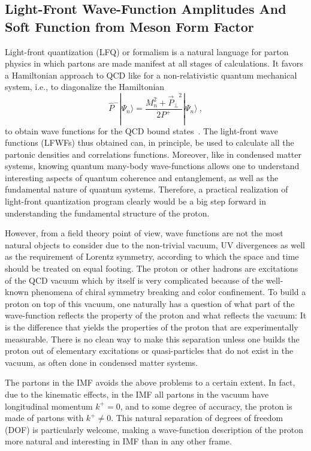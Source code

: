 \subsection{Light-Front Wave-Function Amplitudes And Soft Function from Meson Form Factor}
\label{sec:others}

Light-front quantization (LFQ) or formalism is a natural language for parton physics
in which partons are made manifest at all stages of calculations. It
favors a Hamiltonian approach to QCD like for a non-relativistic quantum
mechanical system, i.e., to diagonalize the Hamiltonian
\begin{equation}
	\hat P^-|\Psi_n\rangle = \frac{M^2_n+{\vec P_\perp}^2}{2P^+}|\Psi_n\rangle \ ,
\end{equation}
to obtain wave functions for the QCD bound states~\cite{Brodsky:1997de}.
The light-front wave functions (LFWFs) thus obtained can, in principle, be used to calculate
all the partonic densities and correlations functions. Moreover, like in
condensed matter systems, knowing quantum many-body wave-functions
allows one to understand interesting aspects of quantum coherence and
entanglement, as well as the fundamental nature of quantum systems.
Therefore, a practical realization of light-front quantization program clearly would be a big step
forward in understanding the fundamental structure of the proton.


However, from a field theory point of view, wave functions are not the most natural
objects to consider due to the non-trivial vacuum, UV divergences as well as the requirement of Lorentz symmetry, according to which the space and time should be treated on equal footing. The proton or other hadrons are
excitations of the QCD vacuum which by itself is very complicated
because of the well-known phenomena of chiral symmetry breaking and color confinement.
To build a proton on top of this vacuum, one naturally has a question of what part of the
wave-function reflects the property of the proton and what reflects the vacuum:
It is the difference that yields the properties
of the proton that are experimentally measurable. There is no clean way to make
this separation unless one builds the proton out of elementary excitations or quasi-particles that
do not exist in the vacuum, as often done in condensed matter systems.

The partons in the IMF avoids the above problems to a certain extent.
In fact, due to the kinematic effects, in the IMF all partons in
the vacuum have longitudinal momentum $k^+=0$, and to some degree of accuracy,
the proton is made of partons with $k^+\ne 0$. This natural separation of
degrees of freedom (DOF) is particularly welcome, making
a wave-function description of the proton more natural and interesting in IMF
than in any other frame.


